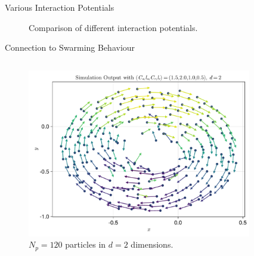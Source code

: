 \documentclass[aspectratio=169, hyperref={colorlinks=true}]{beamer}
\begin{document}
  \begin{frame}{Various Interaction Potentials}
    \begin{figure}[H]
      \centering
      \caption[Comparing potentials]{Comparison of different interaction potentials.}
      \label{fig:comparing-potentials}
    \end{figure}
  \end{frame}

  \begin{frame}{Connection to Swarming Behaviour}
    \begin{columns}
      \begin{column}{0.6\textwidth}
        \begin{figure}[H]
          \centering
          \includegraphics[width=0.9\linewidth]{results/morse-2d/simulation-quiver.pdf}
          \caption[Quiver plot of 120 particles in 2D interacting through the Morse potential]{$N_p = 120$ particles in $d = 2$ dimensions.}
          \label{fig:simulation-quiver-illustration}
        \end{figure}
      \end{column}
      \begin{column}{0.4\textwidth}
        \begin{figure}[H]
          \centering

\end{figure}
\end{column}
\end{columns}
\end{frame}
\end{document}
